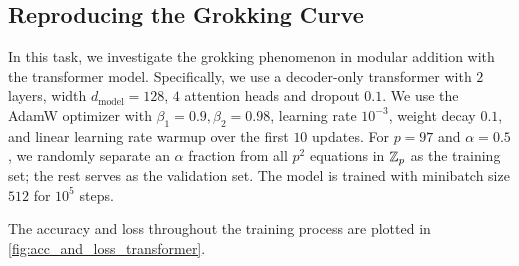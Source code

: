 \subsection{Reproducing the Grokking Curve}
\label{sec:subtask1}

In this task, we investigate the grokking phenomenon in modular addition with the transformer model.
Specifically, we use a decoder-only transformer with $2$ layers, width $d_{\mathrm{model}} = 128$, $4$ attention heads and dropout $0.1$.
We use the AdamW optimizer with $\beta_1 = 0.9, \beta_2 = 0.98$, learning rate $10^{-3}$, weight decay $0.1$, and linear learning rate warmup over the first $10$ updates.
For $p = 97$ and $\alpha = 0.5$, we randomly separate an $\alpha$ fraction from all $p^2$ equations in $\mathbb{Z}_p$ as the training set; the rest serves as the validation set.
The model is trained with minibatch size $512$ for $10^5$ steps.

The accuracy and loss throughout the training process are plotted in \cref{fig:acc_and_loss_transformer}.


